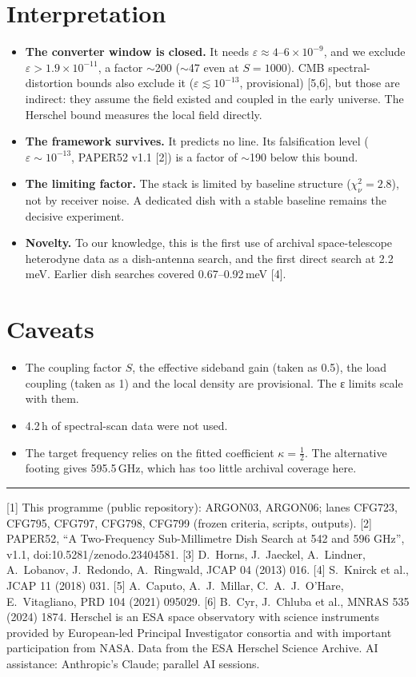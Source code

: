 \documentclass[10pt]{article}
\begin{document}
\section{Interpretation}
\begin{itemize}
\item \textbf{The converter window is closed.} It needs $\varepsilon\approx4$--$6\times10^{-9}$, and we exclude $\varepsilon>1.9\times10^{-11}$, a factor $\sim$200 ($\sim$47 even at $S=1000$). CMB spectral-distortion bounds also exclude it ($\varepsilon\lesssim10^{-13}$, provisional) [5,6], but those are indirect: they assume the field existed and coupled in the early universe. The Herschel bound measures the local field directly.
\item \textbf{The framework survives.} It predicts no line. Its falsification level ($\varepsilon\sim10^{-13}$, PAPER52 v1.1 [2]) is a factor of $\sim$190 below this bound.
\item \textbf{The limiting factor.} The stack is limited by baseline structure ($\chi^2_\nu=2.8$), not by receiver noise. A dedicated dish with a stable baseline remains the decisive experiment.
\item \textbf{Novelty.} To our knowledge, this is the first use of archival space-telescope heterodyne data as a dish-antenna search, and the first direct search at 2.2\,meV. Earlier dish searches covered 0.67--0.92\,meV [4].
\end{itemize}

\section{Caveats}
\begin{itemize}
\item The coupling factor $S$, the effective sideband gain (taken as 0.5), the load coupling (taken as 1) and the local density are provisional. The ε limits scale with them.
\item 4.2\,h of spectral-scan data were not used.
\item The target frequency relies on the fitted coefficient $\kappa=\tfrac12$. The alternative footing gives 595.5\,GHz, which has too little archival coverage here.
\end{itemize}

\vspace{4pt}\hrule\vspace{3pt}
{\footnotesize
[1] This programme (public repository): ARGON03, ARGON06; lanes CFG723, CFG795, CFG797, CFG798, CFG799 (frozen criteria, scripts, outputs).
[2] PAPER52, ``A Two-Frequency Sub-Millimetre Dish Search at 542 and 596 GHz'', v1.1, doi:10.5281/zenodo.23404581.
[3] D.~Horns, J.~Jaeckel, A.~Lindner, A.~Lobanov, J.~Redondo, A.~Ringwald, JCAP 04 (2013) 016.
[4] S.~Knirck et al., JCAP 11 (2018) 031.
[5] A.~Caputo, A.~J.~Millar, C.~A.~J.~O'Hare, E.~Vitagliano, PRD 104 (2021) 095029.
[6] B.~Cyr, J.~Chluba et al., MNRAS 535 (2024) 1874.
Herschel is an ESA space observatory with science instruments provided by European-led Principal Investigator consortia and with important participation from NASA. Data from the ESA Herschel Science Archive.
AI assistance: Anthropic's Claude; parallel AI sessions.}
\end{document}

